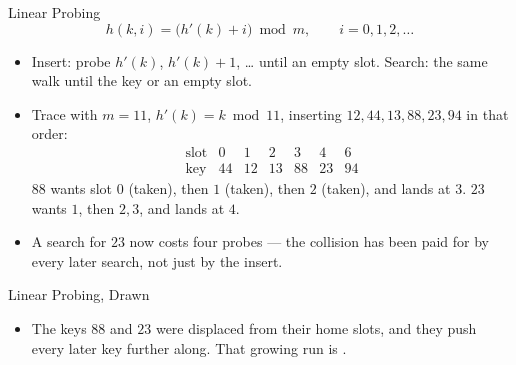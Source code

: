 \documentclass[aspectratio=169]{beamer}
\begin{document}
\begin{frame}{Linear Probing}
  \[
    h(k,i) = \bigl(h'(k) + i\bigr) \bmod m, \qquad i = 0,1,2,\dots
  \]
  \begin{itemize}
    \item Insert: probe $h'(k)$, $h'(k)+1$, \dots{} until an empty slot.
      Search: the same walk until the key or an empty slot.
    \item Trace with $m=11$, $h'(k)=k\bmod 11$, inserting
      $12,44,13,88,23,94$ in that order:
      \[
        \begin{array}{c|cccccc}
          \text{slot} & 0 & 1 & 2 & 3 & 4 & 6 \\
          \hline
          \text{key} & 44 & 12 & 13 & 88 & 23 & 94
        \end{array}
      \]
      $88$ wants slot $0$ (taken), then $1$ (taken), then $2$ (taken), and
      lands at $3$. $23$ wants $1$, then $2,3$, and lands at $4$.
    \item A search for $23$ now costs four probes --- the collision has been
      paid for by every later search, not just by the insert.
  \end{itemize}
\end{frame}

\begin{frame}{Linear Probing, Drawn}
  \begin{center}
  \end{center}
  \vspace{-0.2cm}
  \begin{itemize}
    \item The keys $88$ and $23$ were displaced from their home slots, and
      they push every later key further along. That growing run is
      .
  \end{itemize}
\end{frame}
\end{document}
